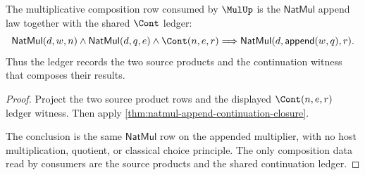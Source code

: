 \begin{theorem}
\label{thm:natmul-append-composition-surface}
The multiplicative composition row consumed by $\MulUp$ is the
$\mathsf{NatMul}$ append law together with the shared $\Cont$ ledger:
$$
\mathsf{NatMul}(d,w,n)\land
\mathsf{NatMul}(d,q,e)\land
\Cont(n,e,r)
\Longrightarrow
\mathsf{NatMul}(d,\mathsf{append}(w,q),r).
$$
Thus the ledger records the two source products and the continuation witness
that composes their results.
\end{theorem}
\begin{proof}
Project the two source product rows and the displayed $\Cont(n,e,r)$ ledger
witness. Then apply \autoref{thm:natmul-append-continuation-closure}.

The conclusion is the same $\mathsf{NatMul}$ row on the appended multiplier,
with no host multiplication, quotient, or classical choice principle. The only
composition data read by consumers are the source products and the shared
continuation ledger.
\end{proof}
